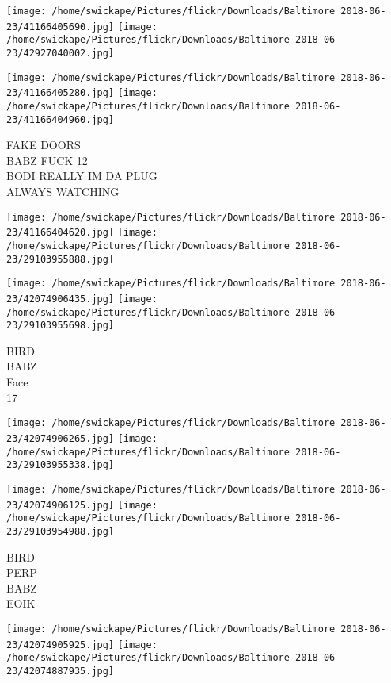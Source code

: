 \documentclass[10pt,letterpaper]{article}
\begin{document}
\texttt{[image: /home/swickape/Pictures/flickr/Downloads/Baltimore 2018-06-23/41166405690.jpg]}
\texttt{[image: /home/swickape/Pictures/flickr/Downloads/Baltimore 2018-06-23/42927040002.jpg]}

\texttt{[image: /home/swickape/Pictures/flickr/Downloads/Baltimore 2018-06-23/41166405280.jpg]}
\texttt{[image: /home/swickape/Pictures/flickr/Downloads/Baltimore 2018-06-23/41166404960.jpg]}

FAKE DOORS\\
BABZ FUCK 12\\
BODI REALLY IM DA PLUG\\
ALWAYS WATCHING\\
\pagebreak

\texttt{[image: /home/swickape/Pictures/flickr/Downloads/Baltimore 2018-06-23/41166404620.jpg]}
\texttt{[image: /home/swickape/Pictures/flickr/Downloads/Baltimore 2018-06-23/29103955888.jpg]}

\texttt{[image: /home/swickape/Pictures/flickr/Downloads/Baltimore 2018-06-23/42074906435.jpg]}
\texttt{[image: /home/swickape/Pictures/flickr/Downloads/Baltimore 2018-06-23/29103955698.jpg]}

BIRD\\
BABZ\\
Face\\
17\\
\pagebreak

\texttt{[image: /home/swickape/Pictures/flickr/Downloads/Baltimore 2018-06-23/42074906265.jpg]}
\texttt{[image: /home/swickape/Pictures/flickr/Downloads/Baltimore 2018-06-23/29103955338.jpg]}

\texttt{[image: /home/swickape/Pictures/flickr/Downloads/Baltimore 2018-06-23/42074906125.jpg]}
\texttt{[image: /home/swickape/Pictures/flickr/Downloads/Baltimore 2018-06-23/29103954988.jpg]}

BIRD\\
PERP\\
BABZ\\
EOIK\\
\pagebreak

\texttt{[image: /home/swickape/Pictures/flickr/Downloads/Baltimore 2018-06-23/42074905925.jpg]}
\texttt{[image: /home/swickape/Pictures/flickr/Downloads/Baltimore 2018-06-23/42074887935.jpg]}
\end{document}
